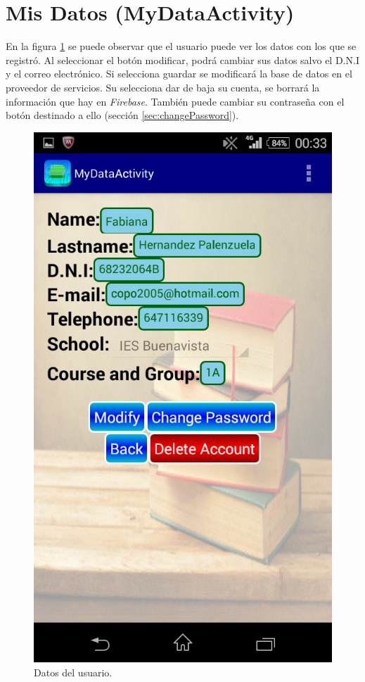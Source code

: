 	\section{Mis Datos (MyDataActivity)} \label{sec:myData}
	
		En la figura \ref{fig:myData} se puede observar que el usuario puede ver los datos con los que se registró. Al seleccionar el botón modificar, podrá cambiar sus datos salvo el D.N.I y el correo electrónico. Si selecciona guardar se modificará la base de datos en el proveedor de servicios.
		Su selecciona dar de baja su cuenta, se borrará la información que hay en {\it Firebase}. También puede cambiar su contraseña con el botón destinado a ello (sección \ref{sec:changePassword}).
		
		\begin{figure}[h !]
			\centering
			\includegraphics[scale=0.2]{Imagenes/App/myData}
			\caption{Datos del usuario.}
			\label{fig:myData}
		\end{figure}
	
